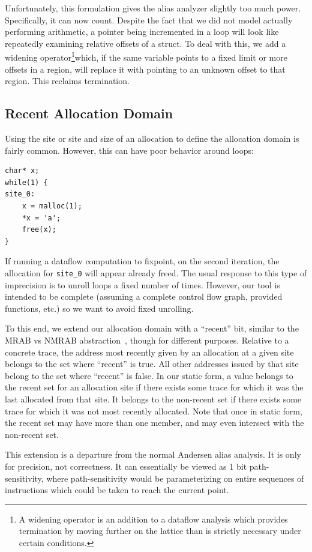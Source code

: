 Unfortunately, this formulation gives the alias analyzer slightly too much power.
Specifically, it can now count.
Despite the fact that we did not model actually performing arithmetic, a pointer being incremented in a loop will look like repeatedly examining relative offsets of a struct.
To deal with this, we add a widening operator\footnote{
	A widening operator is an addition to a dataflow analysis which provides termination by moving further on the lattice than is strictly necessary under certain conditions.
}which, if the same variable points to a fixed limit or more offsets in a region, will replace it with pointing to an unknown offset to that region.
This reclaims termination.

\subsection{Recent Allocation Domain}
\label{sec:effects}
Using the site or site and size of an allocation to define the allocation domain is fairly common.
However, this can have poor behavior around loops:

\begin{lstlisting}
char* x;
while(1) {
site_0:
	x = malloc(1);
	*x = 'a';
	free(x);
}
\end{lstlisting}

If running a dataflow computation to fixpoint, on the second
iteration, the allocation for \texttt{site\_0} will appear already
freed.  The usual response to this type of imprecision is to unroll
loops a fixed number of times.  However, our tool is intended to be
complete (assuming a complete control flow graph, provided functions,
etc.) so we want to avoid fixed unrolling.

To this end, we extend our allocation domain with a ``recent'' bit, similar to the MRAB vs NMRAB abstraction~\cite{vsa}, though for different purposes.
Relative to a concrete trace, the address most recently given by an allocation at a given site belongs to the set where ``recent'' is true.
All other addresses issued by that site belong to the set where ``recent'' is false.
In our static form, a value belongs to the recent set for an allocation site if there exists some trace for which it was the last allocated from that site.
It belongs to the non-recent set if there exists some trace for which it was not most recently allocated.
Note that once in static form, the recent set may have more than one member, and may even intersect with the non-recent set.

This extension is a departure from the normal Andersen alias analysis.
It is only for precision, not correctness.
It can essentially be viewed as 1 bit path-sensitivity, where path-sensitivity would be parameterizing on entire sequences of instructions which could be taken to reach the current point.


